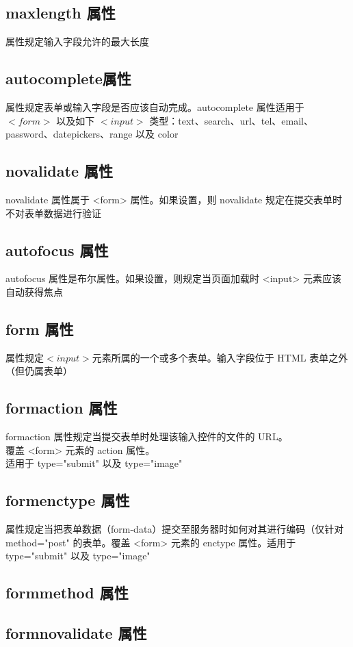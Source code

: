\documentclass[10pt,UTF8]{ctexart}
\begin{document}
\subsection{maxlength 属性}
属性规定输入字段允许的最大长度
\subsection{autocomplete属性}
属性规定表单或输入字段是否应该自动完成。autocomplete 属性适用于 $<form>$ 以及如下 $<input>$ 类型：text、search、url、tel、email、password、datepickers、range 以及 color
\subsection{novalidate 属性}
novalidate 属性属于 <form> 属性。如果设置，则 novalidate 规定在提交表单时不对表单数据进行验证
\subsection{autofocus 属性}
autofocus 属性是布尔属性。如果设置，则规定当页面加载时 <input> 元素应该自动获得焦点

\subsection{form 属性}
属性规定$<input>$元素所属的一个或多个表单。输入字段位于 HTML 表单之外（但仍属表单）

\subsection{formaction 属性}
formaction 属性规定当提交表单时处理该输入控件的文件的 URL。\\
覆盖 <form> 元素的 action 属性。\\
适用于 type="submit" 以及 type="image"
\subsection{formenctype 属性}
属性规定当把表单数据（form-data）提交至服务器时如何对其进行编码（仅针对 method="post" 的表单。覆盖 <form> 元素的 enctype 属性。适用于 type="submit" 以及 type="image"
\subsection{formmethod 属性}
\subsection{formnovalidate 属性}
\end{document}
